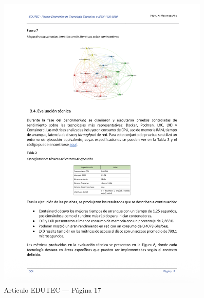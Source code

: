 \begin{figure}[H]
    \centering
    \begin{tcolorbox}[
        colback=white,
        colframe=gray!50,
        boxrule=1pt,
        arc=2pt,
        boxsep=5pt,
        left=3pt,
        right=3pt,
        top=3pt,
        bottom=3pt,
        drop shadow
    ]
        \includegraphics[width=0.95\textwidth,keepaspectratio]{apendices/EDUTEC/17.png}
    \end{tcolorbox}
    \caption{Artículo EDUTEC --- Página 17}\label{fig:edutec-pagina-17}
\end{figure}
\FloatBarrier

